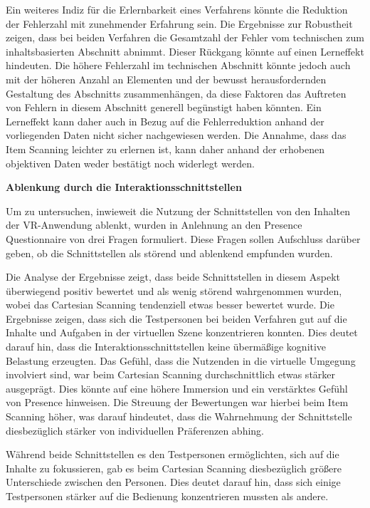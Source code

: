 Ein weiteres Indiz für die Erlernbarkeit eines Verfahrens könnte die Reduktion der Fehlerzahl mit zunehmender Erfahrung sein. Die Ergebnisse zur Robustheit zeigen, dass bei beiden Verfahren die Gesamtzahl der Fehler vom technischen zum inhaltsbasierten Abschnitt abnimmt. Dieser Rückgang könnte auf einen Lerneffekt hindeuten. Die höhere Fehlerzahl im technischen Abschnitt könnte jedoch auch mit der höheren Anzahl an Elementen und der bewusst herausfordernden Gestaltung des Abschnitts zusammenhängen, da diese Faktoren das Auftreten von Fehlern in diesem Abschnitt generell begünstigt haben könnten. Ein Lerneffekt kann daher auch in Bezug auf die Fehlerreduktion anhand der vorliegenden Daten nicht sicher nachgewiesen werden. 
Die Annahme, dass das Item Scanning leichter zu erlernen ist, kann daher anhand der erhobenen objektiven Daten weder bestätigt noch widerlegt werden.

\textbf{Ablenkung durch die Interaktionsschnittstellen}

Um zu untersuchen, inwieweit die Nutzung der Schnittstellen von den Inhalten der VR-Anwendung ablenkt, wurden in Anlehnung an den Presence Questionnaire von \citet{witmer_measuring_1998} drei Fragen formuliert. Diese Fragen sollen Aufschluss darüber geben, ob die Schnittstellen als störend und ablenkend empfunden wurden. 

Die Analyse der Ergebnisse zeigt, dass beide Schnittstellen in diesem Aspekt überwiegend positiv bewertet und als wenig störend wahrgenommen wurden, wobei das Cartesian Scanning tendenziell etwas besser bewertet wurde.
Die Ergebnisse zeigen, dass sich die Testpersonen bei beiden Verfahren gut auf die Inhalte und Aufgaben in der virtuellen Szene konzentrieren konnten. Dies deutet darauf hin, dass die Interaktionsschnittstellen keine übermäßige kognitive Belastung erzeugten. Das Gefühl, dass die Nutzenden in die virtuelle Umgegung involviert sind, war beim Cartesian Scanning durchschnittlich etwas stärker ausgeprägt. Dies könnte auf eine höhere Immersion und ein verstärktes Gefühl von Presence hinweisen. Die Streuung der Bewertungen war hierbei beim Item Scanning höher, was darauf hindeutet, dass die Wahrnehmung der Schnittstelle diesbezüglich stärker von individuellen Präferenzen abhing.

Während beide Schnittstellen es den Testpersonen ermöglichten, sich auf die Inhalte zu fokussieren, gab es beim Cartesian Scanning diesbezüglich größere Unterschiede zwischen den Personen. Dies deutet darauf hin, dass sich einige Testpersonen stärker auf die Bedienung konzentrieren mussten als andere. 

